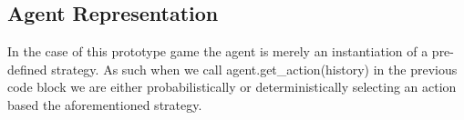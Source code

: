 \subsection{Agent Representation}\label{subsec:agent}
In the case of this prototype game the agent is merely an instantiation of a pre-defined strategy.
As such when we call agent.get\_action(history) in the previous code block we are either probabilistically
or deterministically selecting an action based the aforementioned strategy.

